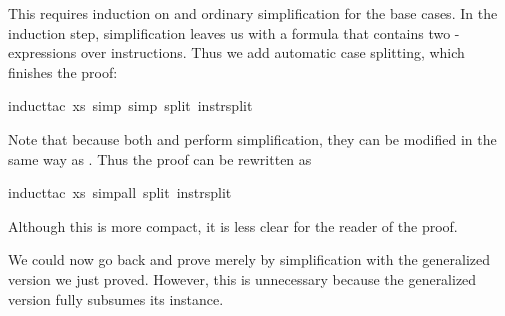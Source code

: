 \begin{isabellebody}
\begin{isamarkuptxt}%
\noindent
This requires induction on  and ordinary simplification for the
base cases. In the induction step, simplification leaves us with a formula
that contains two -expressions over instructions. Thus we add
automatic case splitting, which finishes the proof:%
\end{isamarkuptxt}%
induct{\isacharunderscore}tac\ xs{\isacharcomma}\ simp{\isacharcomma}\ simp\ split{\isacharcolon}\ instr{\isachardot}split{\isacharparenright}%
\begin{isamarkuptext}%
\noindent
Note that because both  and  perform simplification, they can
be modified in the same way as .  Thus the proof can be
rewritten as%
\end{isamarkuptext}%
induct{\isacharunderscore}tac\ xs{\isacharcomma}\ simp{\isacharunderscore}all\ split{\isacharcolon}\ instr{\isachardot}split{\isacharparenright}%
\begin{isamarkuptext}%
\noindent
Although this is more compact, it is less clear for the reader of the proof.

We could now go back and prove 
merely by simplification with the generalized version we just proved.
However, this is unnecessary because the generalized version fully subsumes
its instance.%
%
\end{isamarkuptext}%
\end{isabellebody}%
